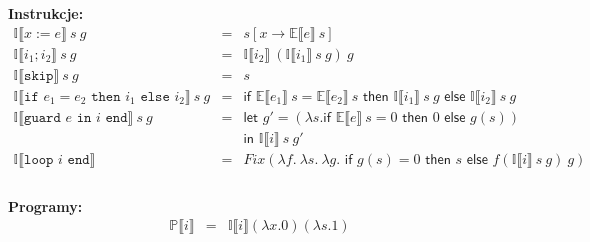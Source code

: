 \documentclass[a4paper,11pt]{article}
\begin{document}
{\bf Instrukcje:}
\begin{eqnarray*}
  \mathbb{I} \llbracket x := e \rrbracket \ s \ g & = & s[x \to \mathbb{E} \llbracket e \rrbracket \ s] \\
  \mathbb{I} \llbracket i_1 ; i_2 \rrbracket \ s \ g & = & \mathbb{I} \llbracket i_2 \rrbracket \ 
    (\mathbb{I} \llbracket i_1 \rrbracket \ s \ g) \ g \\
  \mathbb{I} \llbracket \texttt{skip} \rrbracket \ s \ g & = & s \\
  \mathbb{I} \llbracket \texttt{if } e_1 = e_2 \texttt{ then } i_1 \texttt{ else } i_2 \rrbracket \ s \ g & = &
  \textsf{if } \mathbb{E} \llbracket e_1 \rrbracket \ s = \mathbb{E} \llbracket e_2 \rrbracket \ s 
\textsf{ then } \mathbb{I} \llbracket i_1 \rrbracket \ s \ g 
\textsf{ else } \mathbb{I} \llbracket i_2 \rrbracket \ s \ g \\
  \mathbb{I} \llbracket \texttt{guard } e \texttt{ in } i \texttt{ end} \rrbracket \ s \ g & = &
    \textsf{let } g' = (\lambda s. \textsf{if } \mathbb{E} \llbracket e \rrbracket \ s = 0
			\textsf{ then } 0 \textsf{ else } g(s) ) \\
     & &                \textsf{in } \mathbb{I} \llbracket i \rrbracket \ s \ g' \\
  \mathbb{I} \llbracket \texttt{loop } i \texttt{ end} \rrbracket & = & 
 Fix( \lambda f.\ \lambda s.\ \lambda g. \textsf{ if } g(s) = 0 \textsf{ then } s \textsf{ else } f (\mathbb{I} \llbracket i \rrbracket \ s \ g ) \ g )\\
    \\
\end{eqnarray*}

{\bf Programy:}
\begin{eqnarray*}
\mathbb{P} \llbracket i \rrbracket & = & \mathbb{I} \llbracket i \rrbracket (\lambda x. 0) (\lambda s. 1)
\end{eqnarray*}
\end{document}
